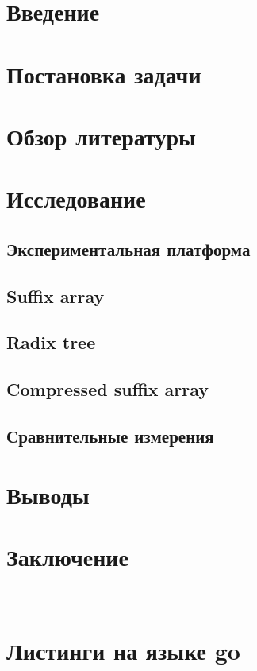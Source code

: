 \newpage
\tableofcontents
\newpage

\section{Введение}


\newpage
\section{Постановка задачи}


\newpage
\section{Обзор литературы}


\newpage
\section{Исследование}


\newpage
\subsection{Экспериментальная платформа}


\newpage
\subsection{Suffix array}


\newpage
\subsection{Radix tree}


\newpage
\subsection{Compressed suffix array}


\newpage
\subsection{Сравнительные измерения}


\newpage
\section{Выводы}

\newpage
\section{Заключение}

\newpage
\appendix
\section{\\Листинги на языке go}

